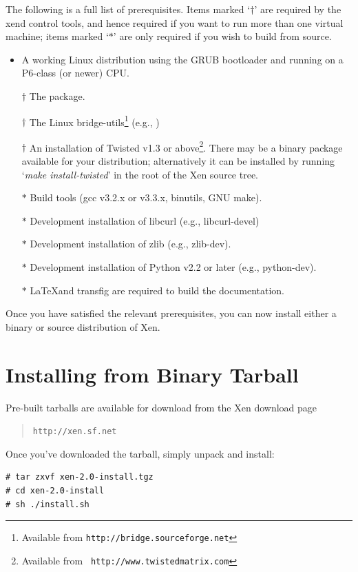 \documentclass[11pt,twoside,final,openright]{report}
\def\xend{{xend}\xspace}
\begin{document}
The following is a full list of prerequisites.  Items marked `$\dag$'
are required by the \xend control tools, and hence required if you
want to run more than one virtual machine; items marked `$*$' are only
required if you wish to build from source.
\begin{itemize}
\item A working Linux distribution using the GRUB bootloader and
running on a P6-class (or newer) CPU.
\item [$\dag$] The  package. 
\item [$\dag$] The Linux bridge-utils\footnote{Available from 
{\tt http://bridge.sourceforge.net}} (e.g., )
\item [$\dag$] An installation of Twisted v1.3 or
above\footnote{Available from {\tt
http://www.twistedmatrix.com}}. There may be a binary package
available for your distribution; alternatively it can be installed by
running `{\sl make install-twisted}' in the root of the Xen source
tree.
\item [$*$] Build tools (gcc v3.2.x or v3.3.x, binutils, GNU make).
\item [$*$] Development installation of libcurl (e.g., libcurl-devel) 
\item [$*$] Development installation of zlib (e.g., zlib-dev).
\item [$*$] Development installation of Python v2.2 or later (e.g., python-dev).
\item [$*$] \LaTeX and transfig are required to build the documentation.
\end{itemize}

Once you have satisfied the relevant prerequisites, you can 
now install either a binary or source distribution of Xen. 

\section{Installing from Binary Tarball} 

Pre-built tarballs are available for download from the Xen 
download page
\begin{quote} 
{\tt http://xen.sf.net}
\end{quote} 

Once you've downloaded the tarball, simply unpack and install: 
\begin{verbatim}
# tar zxvf xen-2.0-install.tgz
# cd xen-2.0-install
# sh ./install.sh 
\end{verbatim} 
\end{document}
